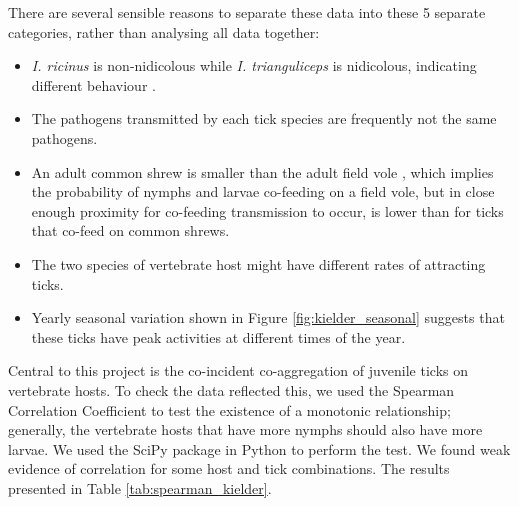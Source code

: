 \documentclass{article}
\begin{document}
There are several sensible reasons to separate these data into these 5 separate categories, rather than analysing all data together:

\begin{itemize}
    \item \textit{I. ricinus} is non-nidicolous while \textit{I. trianguliceps} is nidicolous, indicating different behaviour \cite{Nicholson2019}.
    \item The pathogens transmitted by each tick species are frequently not the same pathogens.
    \item An adult common shrew is smaller than the adult field vole \cite{mammalSociety_FV, mammalSociety_SA}, which implies the probability of nymphs and larvae co-feeding on a field vole, but in close enough proximity for co-feeding transmission to occur, is lower than for ticks that co-feed on common shrews. 
    \item The two species of vertebrate host might have different rates of attracting ticks.
    \item Yearly seasonal variation shown in Figure \ref{fig:kielder_seasonal} suggests that these ticks have peak activities at different times of the year.
\end{itemize}

Central to this project is the co-incident co-aggregation of juvenile ticks on vertebrate hosts. To check the data reflected this, we used the Spearman Correlation Coefficient to test the existence of a monotonic relationship; generally, the vertebrate hosts that have more nymphs should also have more larvae. 
We used the SciPy package in Python to perform the test. We found weak evidence of correlation for some host and tick combinations. The results presented in Table \ref{tab:spearman_kielder}.
\end{document}
